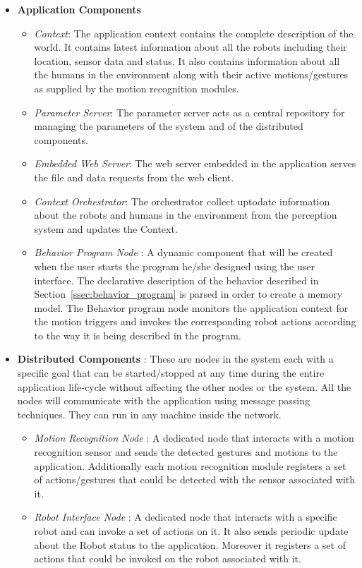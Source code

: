 \documentclass{llncs}
\begin{document}
\begin{itemize}
\item \textbf{Application Components}
\begin{itemize}
\item \emph{Context}: The application context contains the complete description of the world. It contains latest information about all the robots including their location, sensor data and status. It also contains information about all the humans in the environment along with their active motions/gestures as supplied by the motion recognition modules.
\item \emph{Parameter Server}: The parameter server acts as a central repository for managing the parameters of the system and of the distributed components.
\item \emph{Embedded Web Server}: The web server embedded in the application serves the file and data requests from the web client.
\item \emph{Context Orchestrator}: The orchestrator collect uptodate information about the robots and humans in the environment from the perception system and updates the Context.
\item \emph{Behavior Program Node} : A dynamic component that will be created when the user starts the program he/she designed using the user interface. The declarative description of the behavior described in Section~\ref{ssec:behavior_program} is parsed in order to create a memory model. The Behavior program node monitors the application context for the motion triggers and invokes the corresponding robot actions according to the way it is being described in the program.
\end{itemize}
\item \textbf{Distributed Components} : These are nodes in the system each with a specific goal that can be started/stopped at any time during the entire application life-cycle without affecting the other nodes or the system. All the nodes will communicate with the application using message passing techniques. They can run in any machine inside the network.
\begin{itemize}
\item \emph{Motion Recognition Node} : A dedicated node that interacts with a motion recognition sensor and sends the detected gestures and motions to the application. Additionally each motion recognition module registers a set of actions/gestures that could be detected with the sensor associated with it.
\item \emph{Robot Interface Node} : A dedicated node that interacts with a specific robot and can invoke a set of actions on it. It also sends periodic update about the Robot status to the application. Moreover it registers a set of actions that could be invoked on the robot associated with it.

\end{itemize}
\end{itemize}
\end{document}
